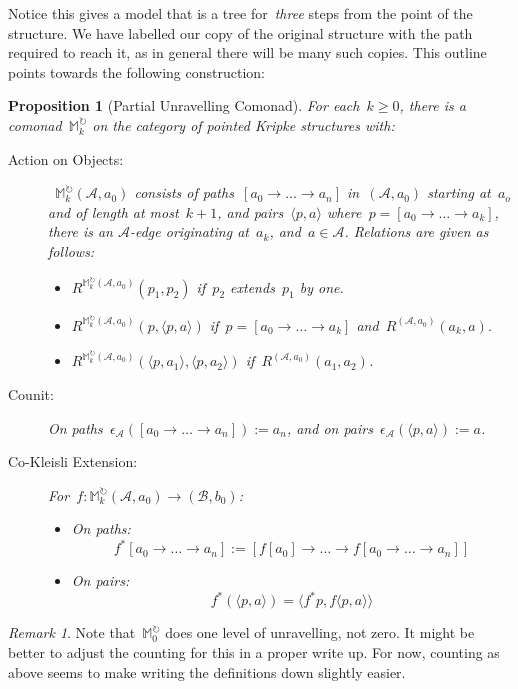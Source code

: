 \documentclass{article}
\theoremstyle{plain}
\newtheorem{proposition}[theorem]{Proposition}
\theoremstyle{definition}
\theoremstyle{remark}
\newtheorem{remark}[theorem]{Remark}
\numberwithin{theorem}{section}
\newcommand{\As}{\mathcal{A}}
\newcommand{\Aso}{(\As, a_0)}
\newcommand{\Bs}{\mathcal{B}}
\newcommand{\Bso}{(\Bs, b_0)}
\newcommand{\lt}{\langle}
\newcommand{\rt}{\rangle}
\newcommand{\Mp}{\mathbb{M}^{\circlearrowright}}
\newcommand{\Mpk}{\Mp_{k}}
\begin{document}
Notice this gives a model that is a tree for~\emph{three} steps from the point of the structure. We have labelled our copy of the original structure with the path required to reach it, as in general there will be many such copies. This outline points towards the following construction:
\begin{proposition}[Partial Unravelling Comonad]
For each~$k \geq 0$, there is a comonad~$\Mpk$ on the category of pointed Kripke structures with:
\begin{description}
\item[Action on Objects:]~$\Mpk(\As,a_0)$ consists of paths~$[a_0 \rightarrow ... \rightarrow a_n]$ in~$\Aso$ starting at~$a_o$ and of length at most~$k + 1$, and pairs~$\lt p, a \rt$ where~$p = [a_0 \rightarrow \ldots \rightarrow a_k]$, there is an $\As$-edge originating at~$a_k$, and~$a \in \As$.
Relations are given as follows:
\begin{itemize}
    \item $R^{\Mpk\Aso}(p_1,p_2)$ if~$p_2$ extends~$p_1$ by one.
    \item $R^{\Mpk\Aso}(p, \langle p, a \rangle)$ if~$p = [a_0 \rightarrow \ldots \rightarrow a_k]$ and~$R^{\Aso}(a_k,a)$.
    \item $R^{\Mpk\Aso}(\langle p, a_1 \rangle, \langle p, a_2 \rangle)$ if~$R^{\Aso}(a_1,a_2)$.
\end{itemize}
\item[Counit:] On paths~$\epsilon_\As([a_0 \rightarrow \ldots \rightarrow a_n]) := a_n$, and on pairs~$\epsilon_\As (\langle p,a \rangle) := a$.
\item[Co-Kleisli Extension:] For~$f : \Mpk\Aso \rightarrow \Bso$:
\begin{itemize}
    \item On paths:
    \begin{equation*}
        f^* [a_0 \rightarrow \ldots \rightarrow a_n] := [f[a_0] \rightarrow \ldots \rightarrow f[a_0 \rightarrow \ldots \rightarrow a_n]]
    \end{equation*}
    \item On pairs:
    \begin{equation*}
        f^*(\lt p,a \rt) = \lt f^* p, f \langle p,a \rangle \rt
    \end{equation*}
\end{itemize}
\end{description}
\end{proposition}
\begin{remark}
Note that~$\Mp_{0}$ does one level of unravelling, not zero. It might be better to adjust the counting for this in a proper write up. For now, counting as above seems to make writing the definitions down slightly easier.
\end{remark}
\end{document}
